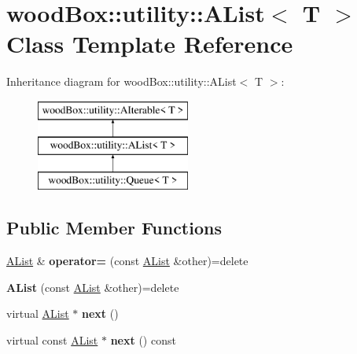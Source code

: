 \hypertarget{classwood_box_1_1utility_1_1_a_list}{}\section{wood\+Box\+:\+:utility\+:\+:A\+List$<$ T $>$ Class Template Reference}
\label{classwood_box_1_1utility_1_1_a_list}
Inheritance diagram for wood\+Box\+:\+:utility\+:\+:A\+List$<$ T $>$\+:\begin{figure}[H]
\begin{center}
\leavevmode
\includegraphics[height=3.000000cm]{classwood_box_1_1utility_1_1_a_list}
\end{center}
\end{figure}
\subsection*{Public Member Functions}
\begin{DoxyCompactItemize}
\item 
\mbox{\label{classwood_box_1_1utility_1_1_a_list_a30c716d7e6462759801d1d3009ed5d13}} 
\mbox{\hyperlink{classwood_box_1_1utility_1_1_a_list}{A\+List}} \& {\bfseries operator=} (const \mbox{\hyperlink{classwood_box_1_1utility_1_1_a_list}{A\+List}} \&other)=delete
\item 
\mbox{\label{classwood_box_1_1utility_1_1_a_list_ae899fa889dc8909ee9cdffb2cdb0d2b4}} 
{\bfseries A\+List} (const \mbox{\hyperlink{classwood_box_1_1utility_1_1_a_list}{A\+List}} \&other)=delete
\item 
\mbox{\label{classwood_box_1_1utility_1_1_a_list_ae3769cd3b298718c827026e8f17a2ece}} 
virtual \mbox{\hyperlink{classwood_box_1_1utility_1_1_a_list}{A\+List}} $\ast$ {\bfseries next} ()
\item 
\mbox{\label{classwood_box_1_1utility_1_1_a_list_a39e93ebf127847d1f8e7d99c8aa90c2e}} 
virtual const \mbox{\hyperlink{classwood_box_1_1utility_1_1_a_list}{A\+List}} $\ast$ {\bfseries next} () const
\end{DoxyCompactItemize}
